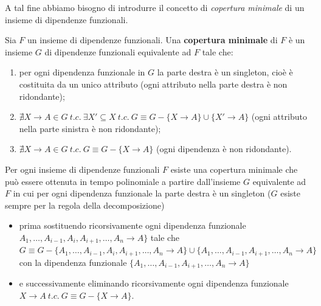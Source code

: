 A tal fine abbiamo bisogno di introdurre il concetto di \emph{copertura minimale} di un insieme di dipendenze funzionali.
\begin{defn}
Sia $F$ un insieme di dipendenze funzionali. Una \textbf{copertura minimale} di $F$ è un insieme $G$ di dipendenze 
funzionali equivalente ad $F$ tale che:
\begin{enumerate}
 \item per ogni dipendenza funzionale in $G$ la parte destra è un singleton, cioè è costituita da un unico
attributo (ogni attributo nella parte destra è non ridondante);
 \item $\nexists X \rightarrow A \in G\ t.c.\ \exists X' \subseteq X\ t.c.\ G \equiv G - \{X \rightarrow A\} 
 \cup \{X' \rightarrow A\}$ (ogni attributo nella parte sinistra è non ridondante);
 \item $\nexists X \rightarrow A \in G\ t.c.\ G \equiv G - \{X \rightarrow A\}$ (ogni dipendenza è non ridondante). 
\end{enumerate}
\end{defn}
Per ogni insieme di dipendenze funzionali $F$ esiste una copertura minimale che può essere ottenuta in tempo polinomiale
a partire dall'insieme $G$ equivalente ad $F$ in cui per ogni dipendenza funzionale la parte destra è un singleton 
($G$ esiste sempre per la regola della decomposizione)
\begin{itemize}
 \item prima sostituendo ricorsivamente ogni dipendenza funzionale $A_1, \ldots, A_{i-1}, A_i, A_{i+1}, \ldots, A_n 
 \rightarrow A\}$ tale che $G \equiv G - \{A_1, \ldots, A_{i-1}, A_i, A_{i+1}, \ldots, A_n \rightarrow A\} \cup 
 \{A_1, \ldots, A_{i-1}, A_{i+1}, \ldots, A_n \rightarrow A\}$ con la dipendenza funzionale $\{A_1, \ldots, A_{i-1}, A_{i+1},
 \ldots, A_n \rightarrow A\}$
 \item e successivamente eliminando ricorsivamente ogni dipendenza funzionale $X \rightarrow A\ t.c.\ G \equiv G- 
 \{X \rightarrow A\}$.
\end{itemize}
 
